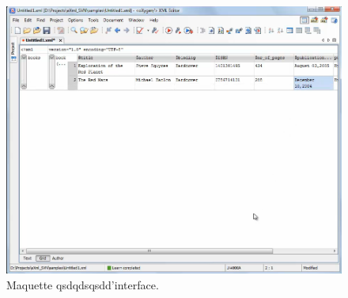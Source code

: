\newpage
\vfill

\begin{figure}[H]
      \centering
      \includegraphics[scale=0.5]{images/analyse-oxygen1.png}
      \caption[Maquette d'interface]{Maquette qsdqdsqsdd'interface.}
\end{figure}


\vfill
\clearpage